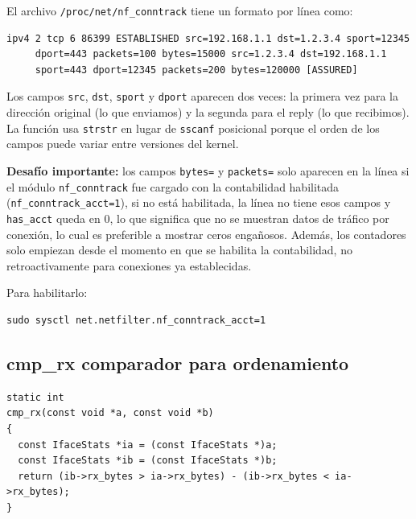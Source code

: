 \documentclass[12pt,letterpaper]{article}
\begin{document}
El archivo \texttt{/proc/net/nf\_conntrack} tiene un formato por línea como:

\begin{Verbatim}[fontsize=\small]
ipv4 2 tcp 6 86399 ESTABLISHED src=192.168.1.1 dst=1.2.3.4 sport=12345
     dport=443 packets=100 bytes=15000 src=1.2.3.4 dst=192.168.1.1
     sport=443 dport=12345 packets=200 bytes=120000 [ASSURED]
\end{Verbatim}

Los campos \texttt{src}, \texttt{dst}, \texttt{sport} y \texttt{dport} aparecen dos veces: la primera vez para
la dirección original (lo que enviamos) y la segunda para el reply (lo que recibimos). La función usa
\texttt{strstr} en lugar de \texttt{sscanf} posicional porque el orden de los campos puede variar entre
versiones del kernel.

\medskip

\textbf{Desafío importante:} los campos \texttt{bytes=} y \texttt{packets=} solo aparecen en la línea si el
módulo \texttt{nf\_conntrack} fue cargado con la contabilidad habilitada (\texttt{nf\_conntrack\_acct=1}), si
no está habilitada, la línea no tiene esos campos y \texttt{has\_acct} queda en 0, lo que significa que no se
muestran datos de tráfico por conexión, lo cual es preferible a mostrar ceros engañosos. Además, los contadores
solo empiezan desde el momento en que se habilita la contabilidad, no retroactivamente para conexiones ya
establecidas.

\medskip

Para habilitarlo:

\begin{Verbatim}[frame=single, rulecolor=\color{black!20}, fontsize=\small]
sudo sysctl net.netfilter.nf_conntrack_acct=1
\end{Verbatim}

\subsection*{cmp\_rx comparador para ordenamiento}

\begin{lstlisting}[style=modernc, caption={\texttt{net\_monitor.c} cmp\_rx()}]
static int
cmp_rx(const void *a, const void *b)
{
  const IfaceStats *ia = (const IfaceStats *)a;
  const IfaceStats *ib = (const IfaceStats *)b;
  return (ib->rx_bytes > ia->rx_bytes) - (ib->rx_bytes < ia->rx_bytes);
}
\end{lstlisting}
\end{document}
